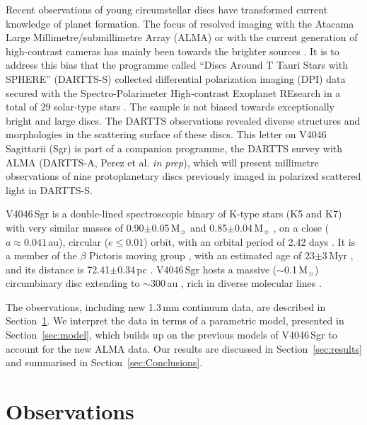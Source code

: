 \documentclass[letters,usenatbib,times]{mnras}
\begin{document}
Recent observations of young circumstellar discs have transformed current knowledge of planet formation. The focus of resolved imaging with the Atacama Large Millimetre/submillimetre Array (ALMA) or with the current generation of high-contrast cameras has mainly been towards the brighter sources \citep[e.g.][]{2020ARA&A..58..483A}. It is to address this bias that the programme called ``Discs Around T Tauri Stars with SPHERE'' (DARTTS-S) collected differential polarization imaging (DPI) data secured with the Spectro-Polarimeter High-contrast Exoplanet REsearch \citep[SPHERE][]{2019A&A...631A.155B} in a total of 29 solar-type stars \citep[][]{Avenhaus_2018,Garufi2020}. The sample is not biased towards exceptionally bright and large discs. The DARTTS observations revealed diverse structures and morphologies in the scattering surface of these discs. This letter on V4046 Sagittarii (Sgr) is part of a companion programme, the DARTTS survey with ALMA (DARTTS-A, Perez et al. {\em in prep}), which will present millimetre observations of nine protoplanetary discs previously imaged in polarized scattered light in DARTTS-S.

V4046\,Sgr is a double-lined spectroscopic binary of K-type stars (K5 and K7) with very similar masses of 0.90$\pm$0.05\,M$_{\sun}$ and 0.85$\pm$0.04\,M$_{\sun}$ \citep{Rosenfeld_2012}, on a close ($a \approx 0.041$\,au), circular ($e\leq0.01$) orbit, with an orbital period of 2.42 days \citep{2000IAUS..200P..28Q}. It is a member of the $\beta$ Pictoris moving group \citep{Zuckerman_2004}, with an estimated age of 23$\pm$3\,Myr \citep{Mamajek_2014}, and its distance is 72.41$\pm$0.34\,pc \citep{Gaia}. V4046\,Sgr hosts a massive ($\sim$0.1\,M$_{\sun}$) circumbinary disc extending to $\sim$300\,au \citep{Rosenfeld_2013, Rodriguez_2010},  rich in diverse molecular lines \citep{Kastner_2018}.

The observations, including new 1.3\,mm continuum data, are described in Section~\ref{sec:Observations}. We interpret the data in terms of a parametric model, presented in Section~\ref{sec:model}, which builds up  on the previous models of V4046\,Sgr  \citep{Rosenfeld_2013, Ru_z_Rodr_guez_2019, 2019ApJ...882..160Q} to account for the new  ALMA data. Our results are discussed in Section~\ref{sec:results} and summarised in Section~\ref{sec:Conclusions}.

\section{Observations} \label{sec:Observations}
\end{document}
